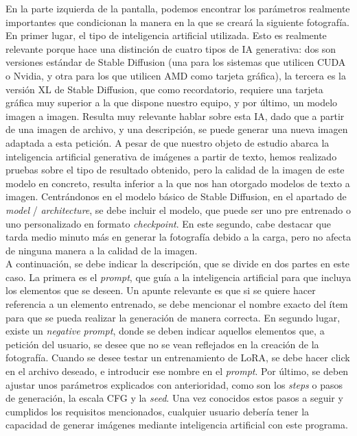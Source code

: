 En la parte izquierda de la pantalla, podemos encontrar los parámetros realmente importantes que condicionan la manera en la que se creará la siguiente fotografía. En primer lugar, el tipo de inteligencia artificial utilizada. Esto es realmente relevante porque hace una distinción de cuatro tipos de IA generativa: dos son versiones estándar de Stable Diffusion (una para los sistemas que utilicen CUDA o Nvidia, y otra para los que utilicen AMD como tarjeta gráfica), la tercera es la versión XL de Stable Diffusion, que como recordatorio, requiere una tarjeta gráfica muy superior a la que dispone nuestro equipo, y por último, un modelo imagen a imagen. Resulta muy relevante hablar sobre esta IA, dado que a partir de una imagen de archivo, y una descripción, se puede generar una nueva imagen adaptada a esta petición. A pesar de que nuestro objeto de estudio abarca la inteligencia artificial generativa de imágenes a partir de texto, hemos realizado pruebas sobre el tipo de resultado obtenido, pero la calidad de la imagen de este modelo en concreto, resulta inferior a la que nos han otorgado modelos de texto a imagen. Centrándonos en el modelo básico de Stable Diffusion, en el apartado de \textit{model} / \textit{architecture}, se debe incluir el modelo, que puede ser uno pre entrenado o uno personalizado en formato \textit{checkpoint}. En este segundo, cabe destacar que tarda medio minuto más en generar la fotografía debido a la carga, pero no afecta de ninguna manera a la calidad de la imagen. \\

A continuación, se debe indicar la descripción, que se divide en dos partes en este caso. La primera es el \textit{prompt}, que guía a la inteligencia artificial para que incluya los elementos que se deseen. Un apunte relevante es que si se quiere hacer referencia a un elemento entrenado, se debe mencionar el nombre exacto del ítem para que se pueda realizar la generación de manera correcta. En segundo lugar, existe un \textit{negative prompt}, donde se deben indicar aquellos elementos que, a petición del usuario, se desee que no se vean reflejados en la creación de la fotografía. Cuando se desee testar un entrenamiento de LoRA, se debe hacer click en el archivo deseado, e introducir ese nombre en el \textit{prompt}. Por último, se deben ajustar unos parámetros explicados con anterioridad, como son los \textit{steps} o pasos de generación, la escala CFG y la \textit{seed}. Una vez conocidos estos pasos a seguir y cumplidos los requisitos mencionados, cualquier usuario debería tener la capacidad de generar imágenes mediante inteligencia artificial con este programa.\\ 

